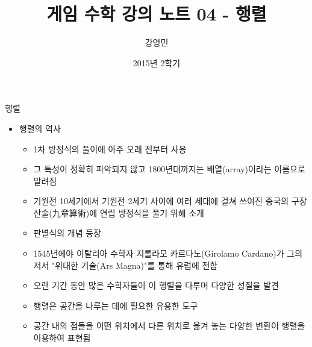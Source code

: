 \documentclass{beamer}
\title[게임수학 - 행렬]{ 게임 수학 강의 노트 04 - 행렬}
\author{강영민}
\institute{동명대학교}
\date{2015년 2학기}
\begin{document}
\begin{frame}
  \titlepage
\end{frame}





\begin{frame}{행렬}

\begin{itemize}
\item 행렬의 역사
	\begin{itemize}
	\item 1차 방정식의 풀이에 아주 오래 전부터 사용
	\item 그 특성이 정확히 파악되지 않고 1800년대까지는 배열(array)이라는 이름으로 알려짐
	\item 기원전 10세기에서 기원전 2세기 사이에 여러 세대에 걸쳐 쓰여진 중국의 구장산술(九章算術)에 연립 방정식을 풀기 위해 소개
	\item 판별식의 개념 등장
	\item 1545년에야 이탈리아 수학자 지롤라모 카르다노(Girolamo Cardano)가 그의 저서 "위대한 기술(Ars Magna)"를 통해 유럽에 전함
	\item 오랜 기간 동안 많은 수학자들이 이 행렬을 다루며 다양한 성질을 발견
	\item 행렬은 공간을 나루는 데에 필요한 유용한 도구
	\item 공간 내의 점들을 이떤 위치에서 다른 위치로 옮겨 놓는 다양한 변환이 행렬을 이용하여 표현됨
	\end{itemize}
\end{itemize}

\end{frame}


\end{document}
